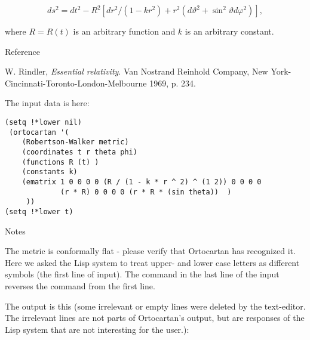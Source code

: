 $$ ds^2 = dt^2 - R^2 [dr^2 /(1 - kr^2) + r^2 (d\vartheta^2 + \sin^2\vartheta d
\varphi^2)], $$

\noindent where $R = R (t)$ is an arbitrary function and $k$ is an arbitrary
constant.

\bigskip

\centerline{Reference}

W. Rindler, {\it Essential relativity}. Van Nostrand Reinhold Company,  New
York-Cincinnati-Toronto-London-Melbourne 1969, p.
     234.

The input data is here:

\bigskip

\begin{verbatim}
(setq !*lower nil)
 (ortocartan '(
    (Robertson-Walker metric)
    (coordinates t r theta phi)
    (functions R (t) )
    (constants k)
    (ematrix 1 0 0 0 0 (R / (1 - k * r ^ 2) ^ (1 2)) 0 0 0 0
             (r * R) 0 0 0 0 (r * R * (sin theta))  )
     ))
(setq !*lower t)
\end{verbatim}

\bigskip

\centerline{Notes}

The metric is conformally flat  -  please  verify  that
     Ortocartan has recognized it. Here we asked the Lisp  system
     to treat upper- and lower case letters as different  symbols
     (the first line of input). The command in the last
     line of the input reverses the command from the first  line.

The output is this (some irrelevant or empty lines were deleted by the
text-editor. The irrelevant lines are not parts of Ortocartan's output, but are
responses of the Lisp system that are not interesting for the user.):

\bigskip

